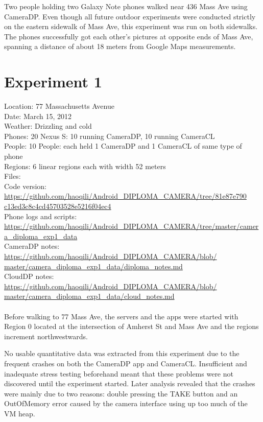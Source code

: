 Two people holding two Galaxy Note phones walked near 436 Mass Ave using CameraDP. Even though all future outdoor experiments were conducted strictly on the eastern sidewalk of Mass Ave, this experiment was run on both sidewalks. The phones successfully got each other's pictures at opposite ends of Mass Ave, spanning a distance of about 18 meters from Google Maps measurements. 

\section{Experiment 1}

Location: 77 Massachusetts Avenue\\
Date: March 15, 2012\\
Weather: Drizzling and cold\\
Phones: 20 Nexus S: 10 running CameraDP, 10 running CameraCL\\
People: 10 People: each held 1 CameraDP and 1 CameraCL of same type of phone\\
Regions: 6 linear regions each with width 52 meters\\
Files:\\
Code version: {\url{https://github.com/haoqili/Android_DIPLOMA_CAMERA/tree/81e87e790}}\\
{\url{c13ed3c8c4cd45703528e5216f04ec4}}\\
Phone logs and scripts: {\url{https://github.com/haoqili/Android_DIPLOMA_CAMERA/tree/master/camera_diploma_exp1_data}}\\ 
CameraDP notes: {\url{https://github.com/haoqili/Android_DIPLOMA_CAMERA/blob/}}\\
{\url{master/camera_diploma_exp1_data/diploma_notes.md}}\\
CloudDP notes: {\url{https://github.com/haoqili/Android_DIPLOMA_CAMERA/blob/}}\\
{\url{master/camera_diploma_exp1_data/cloud_notes.md}}\\
\\
Before walking to 77 Mass Ave, the servers and the apps were started with Region 0 located at the intersection of Amherst St and Mass Ave and the regions increment northwestwards.

No usable quantitative data was extracted from this experiment due to the frequent crashes on both the CameraDP app and CameraCL. Insufficient and inadequate stress testing beforehand meant that these problems were not discovered until the experiment started. Later analysis revealed that the crashes were mainly due to two reasons: double pressing the TAKE button and an OutOfMemory error caused by the camera interface using up too much of the VM heap. 

